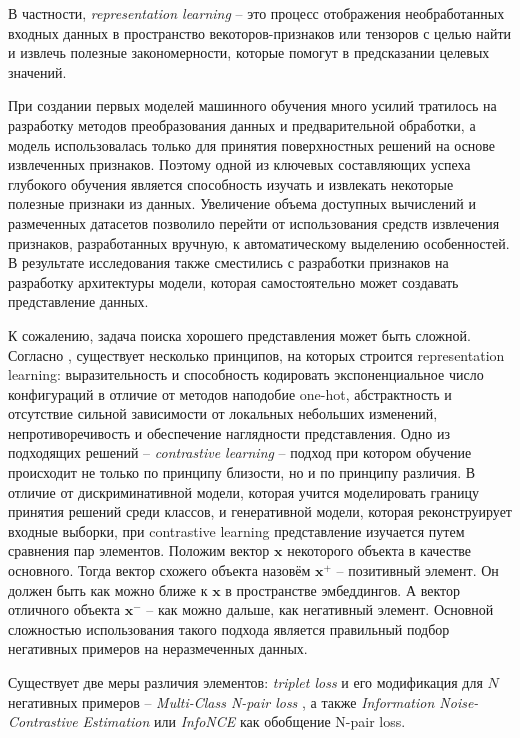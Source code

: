 \documentclass[a4paper, 14pt]{article}
\begin{document}
В частности, \textit{representation learning} -- это процесс отображения необработанных входных данных в пространство векоторов-признаков или тензоров с целью найти и извлечь полезные закономерности, которые помогут в предсказании целевых значений.

При создании первых моделей машинного обучения много усилий тратилось на разработку методов преобразования данных и предварительной обработки, а модель использовалась только для принятия поверхностных решений на основе извлеченных признаков. Поэтому одной из ключевых составляющих успеха глубокого обучения является способность изучать и извлекать некоторые полезные признаки из данных. Увеличение объема доступных вычислений и размеченных датасетов позволило перейти от использования средств извлечения признаков, разработанных вручную, к автоматическому выделению особенностей. В результате исследования также сместились с разработки признаков на разработку архитектуры модели, которая самостоятельно может создавать представление данных.

К сожалению, задача поиска хорошего представления может быть сложной. Согласно \citep{LeKhac2020}, существует несколько принципов, на которых строится representation learning: выразительность и способность кодировать экспоненциальное число конфигураций в отличие от методов наподобие one-hot, абстрактность и отсутствие сильной зависимости от локальных небольших изменений, непротиворечивость и обеспечение наглядности представления. Одно из подходящих решений -- \textit{contrastive learning} -- подход при котором обучение происходит не только по принципу близости, но и по принципу различия. В отличие от дискриминативной модели, которая учится моделировать границу принятия решений среди классов, и генеративной модели, которая реконструирует входные выборки, при contrastive learning представление изучается путем сравнения пар элементов. Положим вектор $\textbf{x}$ некоторого объекта в качестве основного. Тогда вектор схожего объекта назовём $\textbf{x}^+$ -- позитивный элемент. Он должен быть как можно ближе к $\textbf{x}$ в пространстве эмбеддингов. А вектор отличного объекта $\textbf{x}^-$ -- как можно дальше, как негативный элемент. Основной сложностью использования такого подхода является правильный подбор негативных примеров на неразмеченных данных.

Существует две меры различия элементов: \textit{triplet loss} \citep{Schroff2015} и его модификация для $N$ негативных примеров -- \textit{Multi-Class N-pair loss} \citep{Sohn2016ImprovedDM}, а также \textit{Information Noise-Contrastive Estimation} или \textit{InfoNCE} \citep{Oord2018RepresentationLW} как обобщение N-pair loss.
\end{document}
